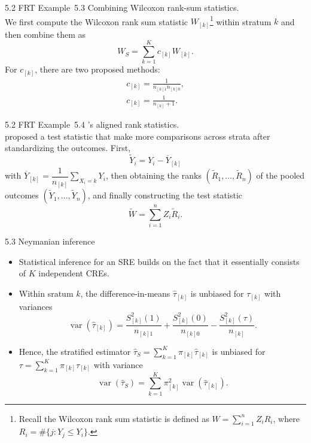 \documentclass[aspectratio=169, 12pt]{beamer}
\begin{document}
\begin{frame}{5.2 FRT}
  Example~5.3 Combining Wilcoxon rank-sum statistics.\\
  We first compute the Wilcoxon rank sum statistic $W_{[k]}$\footnote{\scriptsize Recall the Wilcoxon rank sum statistic is defined as $W=\sum_{i=1}^{n}Z_iR_i$, where $R_i=\#\{j:Y_j\leq Y_i\}$.} within stratum $k$ and then combine them as 
  \[
  W_S = \sum_{k=1}^{K}c_{[k]}W_{[k]}.
  \]
  For $c_{[k]}$, there are two proposed methods:
  \begin{gather*}
    c_{[k]}=\frac{1}{n_{[k]1}n_{[k]0}},\\
    c_{[k]}=\frac{1}{n_{[k]}+1}.
  \end{gather*}
\end{frame}

\begin{frame}{5.2 FRT}
  Example~5.4 \citet{hodges2011rank}'s aligned rank statistics.\\
  \citet{hodges2011rank} proposed a test statistic that make more comparisons across strata after standardizing the outcomes. First,
  \[
  \widetilde{Y}_i=Y_i-\overline{Y}_{[k]}
  \]
  with $\overline{Y}_{[k]}=\dfrac{1}{n_{[k]}}\sum_{X_i=k}^{}Y_i$, then obtaining the ranks $(\widetilde{R}_1,\dots,\widetilde{R}_n)$ of the pooled outcomes $(\widetilde{Y}_1,\dots,\widetilde{Y}_n)$, and finally constructing the test statistic
  \[
  \widetilde{W} = \sum_{i=1}^{n}Z_i\widetilde{R}_i.
  \]
\end{frame}

\begin{frame}{5.3 Neymanian inference}
  \begin{itemize}
    \item Statistical inference for an SRE builds on the fact that it essentially consists of $K$ independent CREs.
    \item Within sratum $k$, the difference-in-means $\widehat{\tau}_{[k]}$ is unbiased for $\tau_{[k]}$ with variances
    \[
    \operatorname{var}(\widehat{\tau}_{[k]}) = \frac{S_{[k]}^2(1)}{n_{[k]1}} + \frac{S_{[k]}^2(0)}{n_{[k]0}} - \frac{S_{[k]}^2(\tau)}{n_{[k]}}.
    \]
    \item Hence, the stratified estimator $\widehat{\tau}_S=\sum_{k=1}^{K}\pi_{[k]}\widehat{\tau}_{[k]}$ is unbiased for $\tau=\sum_{k=1}^{K}\pi_{[k]}\tau_{[k]}$ with variance $$\operatorname{var}(\widehat{\tau}_S)=\sum_{k=1}^{K}\pi_{[k]}^2\operatorname{var}(\widehat{\tau}_{[k]}).$$
  \end{itemize}
\end{frame}
\end{document}
